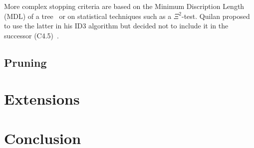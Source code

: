 More complex stopping criteria are based on the Minimum Discription Length (MDL) of a tree~\cite{mdlstopping} or on statistical techniques such as a $\Xi^2$-test. Quilan proposed to use the latter in his ID3 algorithm but decided not to include it in the successor (C4.5)~\cite{id3ter, c45}.

\subsection{Pruning}
\cite{quinlan1987simplifying} %
\cite{repanalysis}
\cite{mdlpruning}
\cite{backproppruning}
\cite{mansour1997pessimistic}
\cite{breslow1997simplifying}
\cite{elomaa1999biases}
\cite{mingers1989empirical}
\cite{elomaa2001analysis} %
\cite{esposito1997comparative}

\section{Extensions}


\section{Conclusion}

